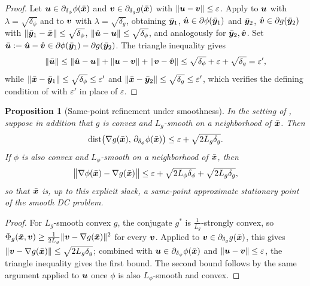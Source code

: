 \documentclass[english]{article}
\newtheorem{proposition}{Proposition}[section]
\begin{document}
\begin{proof}
Let $\bm{u}\in\partial_{\delta_\phi}\phi(\bar{\bm{x}})$ and
$\bm{v}\in\partial_{\delta_g}g(\bar{\bm{x}})$ with $\|\bm{u}-\bm{v}\|\le\varepsilon$.
Apply  to $\bm{u}$ with $\lambda=\sqrt{\delta_\phi}$
and to $\bm{v}$ with $\lambda=\sqrt{\delta_g}$, obtaining $\bar{\bm{y}}_1$,
$\hat{\bm{u}}\in\partial\phi(\bar{\bm{y}}_1)$ and $\bar{\bm{y}}_2$,
$\hat{\bm{v}}\in\partial g(\bar{\bm{y}}_2)$ with $\|\bar{\bm{y}}_1-\bar{\bm{x}}\|\le\sqrt{\delta_\phi}$,
$\|\hat{\bm{u}}-\bm{u}\|\le\sqrt{\delta_\phi}$, and analogously for
$\bar{\bm{y}}_2,\hat{\bm{v}}$. Set $\bar{\bm{u}}:=\hat{\bm{u}}-\hat{\bm{v}}\in\partial\phi(\bar{\bm{y}}_1)-\partial g(\bar{\bm{y}}_2)$. The triangle inequality gives
\[
    \|\bar{\bm{u}}\|
    \le\|\hat{\bm{u}}-\bm{u}\|+\|\bm{u}-\bm{v}\|+\|\bm{v}-\hat{\bm{v}}\|
    \le\sqrt{\delta_\phi}+\varepsilon+\sqrt{\delta_g}=\varepsilon',
\]
while $\|\bar{\bm{x}}-\bar{\bm{y}}_1\|\le\sqrt{\delta_\phi}\le\varepsilon'$ and
$\|\bar{\bm{x}}-\bar{\bm{y}}_2\|\le\sqrt{\delta_g}\le\varepsilon'$, which verifies the
defining condition of  with
$\varepsilon'$ in place of $\varepsilon$.
\end{proof}

\begin{proposition}[Same-point refinement under smoothness]
\label{prop:reverse-smooth}
In the setting of , suppose in addition that
$g$ is convex and $L_g$-smooth on a neighborhood of $\bar{\bm{x}}$. Then
\[
    \operatorname{dist}\bigl(\nabla g(\bar{\bm{x}}),\,\partial_{\delta_\phi}\phi(\bar{\bm{x}})\bigr)
    \le\varepsilon+\sqrt{2L_g\delta_g}.
\]
If $\phi$ is also convex and $L_\phi$-smooth on a neighborhood of
$\bar{\bm{x}}$, then
\[
    \bigl\|\nabla\phi(\bar{\bm{x}})-\nabla g(\bar{\bm{x}})\bigr\|
    \le\varepsilon+\sqrt{2L_\phi\delta_\phi}+\sqrt{2L_g\delta_g},
\]
so that $\bar{\bm{x}}$ is, up to this explicit slack, a same-point approximate
stationary point of the smooth DC problem.
\end{proposition}

\begin{proof}
For $L_g$-smooth convex $g$, the conjugate $g^*$ is
$\tfrac1{L_g}$-strongly convex, so $\Phi_g(\bar{\bm{x}},\bm{v})\ge
\tfrac1{2L_g}\|\bm{v}-\nabla g(\bar{\bm{x}})\|^2$ for every $\bm{v}$. Applied to
$\bm{v}\in\partial_{\delta_g}g(\bar{\bm{x}})$, this gives
$\|\bm{v}-\nabla g(\bar{\bm{x}})\|\le\sqrt{2L_g\delta_g}$; combined with
$\bm{u}\in\partial_{\delta_\phi}\phi(\bar{\bm{x}})$ and $\|\bm{u}-\bm{v}\|\le\varepsilon$,
the triangle inequality gives the first bound. The second bound follows by
the same argument applied to $\bm{u}$ once $\phi$ is also $L_\phi$-smooth and
convex.
\end{proof}
\end{document}
